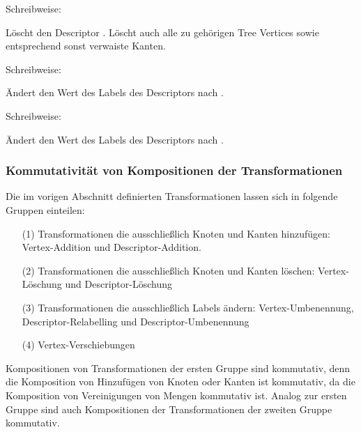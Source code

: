 \begin{definition}
Schreibweise:  \par

Löscht den Descriptor . Löscht auch alle zu  gehörigen Tree Vertices sowie entsprechend sonst verwaiste Kanten.
\end{definition}

\begin{definition}
Schreibweise:  \par

Ändert den Wert des Labels  des Descriptors  nach .
\end{definition}

\begin{definition}
Schreibweise:  \par

Ändert den Wert des Labels  des Descriptors  nach .
\end{definition}

\subsubsection{Kommutativität von Kompositionen der Transformationen}
\label{sec:trans_prop}
Die im vorigen Abschnitt definierten Transformationen lassen sich in folgende Gruppen einteilen:
\begin{enumerate}
 \item[(1)] Transformationen die ausschließlich Knoten und Kanten hinzufügen: Vertex-Addition und Descriptor-Addition. 
 \item[(2)] Transformationen die ausschließlich Knoten und Kanten löschen: Vertex-Löschung und Descriptor-Löschung
 \item[(3)] Transformationen die ausschließlich Labels ändern: Vertex-Umbenennung, Descriptor-Relabelling und Descriptor-Umbenennung
 \item[(4)] Vertex-Verschiebungen
\end{enumerate}

Kompositionen von Transformationen der ersten Gruppe sind kommutativ, denn die Komposition von Hinzufügen von Knoten oder Kanten ist kommutativ, da die Komposition von Vereinigungen von Mengen kommutativ ist. Analog zur ersten Gruppe sind auch Kompositionen der Transformationen der zweiten Gruppe kommutativ.\par

